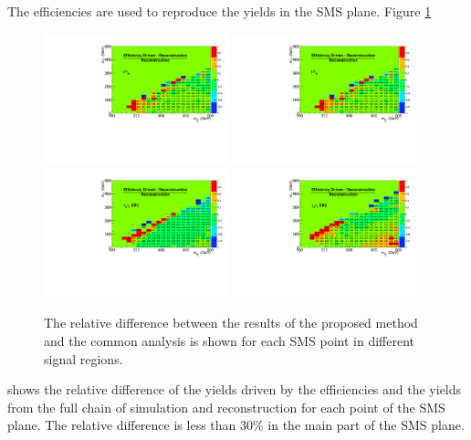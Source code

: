 The efficiencies are used to reproduce the yields in the SMS plane. 
Figure \ref{fig:NormalizedDiff}
\begin{figure}[!Hhtb]
\centering
\includegraphics[width=0.475\textwidth,keepaspectratio=true]{ModelTesting/NormalizedDiffmuTau.pdf}
\includegraphics[width=0.475\textwidth,keepaspectratio=true]{ModelTesting/NormalizedDiffmuTau.pdf}
\includegraphics[width=0.475\textwidth,keepaspectratio=true]{ModelTesting/NormalizedDiffTauTauBin1.pdf}
\includegraphics[width=0.475\textwidth,keepaspectratio=true]{ModelTesting/NormalizedDiffTauTauBin2.pdf}
\caption{The relative difference between the results of the proposed method and the common analysis is shown for each SMS point in different signal regions.}
\label{fig:NormalizedDiff}
\end{figure}
shows the relative difference of the yields driven by the
efficiencies and the yields from the full chain of simulation and reconstruction for each point of the SMS plane. The relative
difference is less than 30\% in the main part of the SMS plane.


